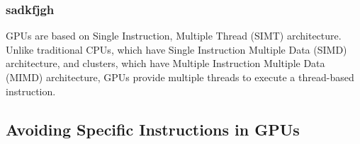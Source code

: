 \subsubsection{sadkfjgh}
GPUs are based on Single Instruction, Multiple Thread (SIMT) architecture. Unlike traditional CPUs, which have Single Instruction Multiple Data (SIMD) architecture, and clusters, which have Multiple Instruction Multiple Data (MIMD) architecture, GPUs provide multiple threads to execute a thread-based instruction. 

\subsection{Avoiding Specific Instructions in GPUs}
